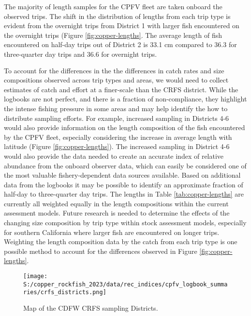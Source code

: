\documentclass[11pt,
  english,
  letterpaper,
]{article}
\begin{document}
The majority of length samples for the CPFV fleet are taken onboard the observed trips. The shift in the distribution of lengths from each trip type is evident from the overnight trips from District 1 with larger fish encountered on the overnight trips (Figure \ref{fig:copper-lengths}. The average length of fish encountered on half-day trips out of District 2 is 33.1 cm compared to 36.3 for three-quarter day trips and 36.6 for overnight trips.

To account for the differences in the the differences in catch rates and size compositions observed across trip types and areas, we would need to collect estimates of catch and effort at a finer-scale than the CRFS district. While the logbooks are not perfect, and there is a fraction of non-compliance, they highlight the intense fishing pressure in some areas and may help identify the how to distribute sampling efforts. For example, increased sampling in Districts 4-6 would also provide information on the length composition of the fish encountered by the CPFV fleet, especially considering the increase in average length with latitude (Figure \ref{fig:copper-lengths}). The increased sampling in District 4-6 would also provide the data needed to create an accurate index of relative abundance from the onboard observer data, which can easily be considered one of the most valuable fishery-dependent data sources available. Based on additional data from the logbooks it may be possible to identify an approximate fraction of half-day to three-quarter day trips. The lengths in Table \ref{tab:copper-lengths} are currently all weighted equally in the length compositions within the current assessment models. Future research is needed to determine the effects of the changing size composition by trip type within stock assessment models, especially for southern California where larger fish are encountered on longer trips. Weighting the length composition data by the catch from each trip type is one possible method to account for the differences observed in Figure \ref{fig:copper-lengths}.

\newpage

\begin{figure}
\centering
\texttt{[image: S:/copper\_rockfish\_2023/data/rec\_indices/cpfv\_logbook\_summaries/crfs\_districts.png]}
\caption{Map of the CDFW CRFS sampling Districts.\label{fig:crfs-districts}}
\end{figure}

\pagebreak
\end{document}
